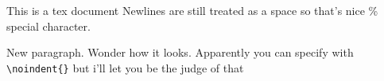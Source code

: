 \documentclass{article}
\begin{document}
This is a tex document %
Newlines are still treated as a space so that's nice \% special character.

New paragraph. Wonder how it looks. Apparently you can specify with \verb"\noindent{}"  but i'll let you be the judge of that
\end{document}
